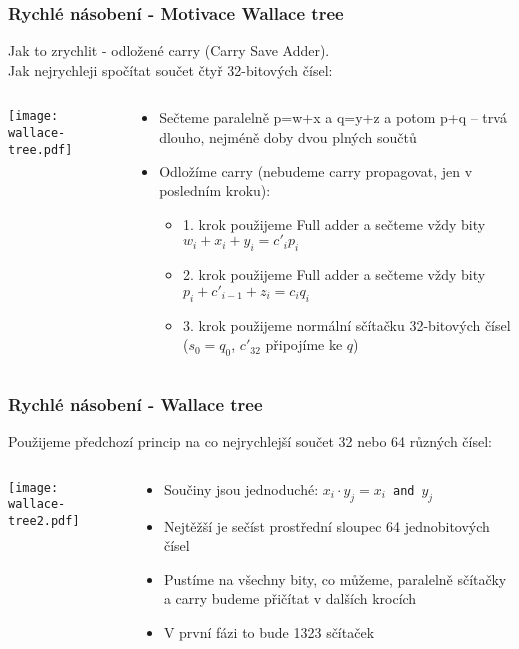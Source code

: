\documentclass{beamer}
\begin{document}
\begin{frame}
\frametitle{Rychlé násobení - Motivace Wallace tree}

Jak to zrychlit - odložené carry (Carry Save Adder).\\
Jak nejrychleji spočítat součet čtyř 32-bitových čísel:\\
\begin{columns}
\begin{column}{0.35\textwidth}
\texttt{[image: wallace-tree.pdf]}
\end{column}
\hfill
\begin{column}{0.65\textwidth}
\begin{itemize}
\item Sečteme paralelně p=w+x a q=y+z a potom p+q -- trvá dlouho, nejméně doby dvou plných součtů
\item Odložíme carry (nebudeme carry propagovat, jen v posledním kroku):
\begin{itemize}
\item 1. krok použijeme Full adder a sečteme vždy bity $w_i+x_i+y_i = c'_ip_i$
\item 2. krok použijeme Full adder a sečteme vždy bity $p_i+c'_{i-1}+z_i = c_iq_i$
\item 3. krok použijeme normální sčítačku 32-bitových čísel ($s_0=q_0$, $c'_32$ připojíme ke $q$)
\end{itemize}
\end{itemize}
\end{column}
\end{columns}
\end{frame}

\begin{frame}
\frametitle{Rychlé násobení - Wallace tree}

Použijeme předchozí princip na co nejrychlejší součet 32 nebo 64 různých čísel:
\begin{columns}
\begin{column}{0.6\textwidth}
\texttt{[image: wallace-tree2.pdf]}
\end{column}
\hfill
\begin{column}{0.4\textwidth}
\begin{itemize}
\item Součiny jsou jednoduché: $x_i \cdot y_j=x_i$~\texttt{and}~$y_j$
\item Nejtěžší je sečíst prostřední sloupec 64 jednobitových čísel
\item Pustíme na všechny bity, co můžeme, paralelně sčítačky a carry budeme přičítat v dalších krocích
\item V první fázi to bude 1323 sčítaček
\end{itemize}
\end{column}
\end{columns}

\end{frame}
\end{document}
